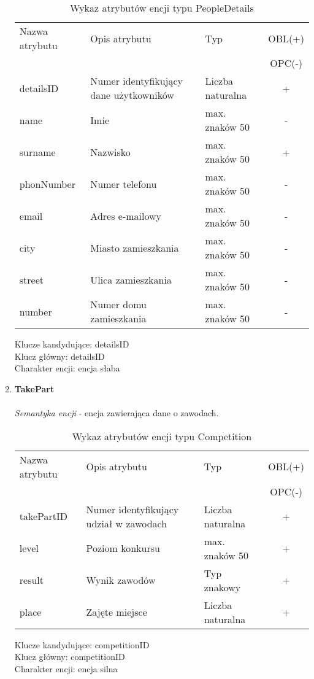 \documentclass[12pt,twoside]{report}
\begin{document}
\begin{enumerate}[start=10,label={\bfseries ENC$\backslash$0\arabic*}]
	\begin{table}[h!]
		\centering
		\begin{tabular}{|l|l|l|c|}
			\hline
			Nazwa atrybutu & Opis atrybutu & Typ & OBL(+) \\
			 & & &  OPC(-) \\
			\hline
			detailsID & Numer identyfikujący dane użytkowników & Liczba naturalna & + \\
			\hline
			name & Imie & max. znaków 50 & - \\
			\hline
			surname & Nazwisko & max. znaków 50 & + \\
			\hline
			phonNumber & Numer telefonu & max. znaków 50 & - \\
			\hline
			email & Adres e-mailowy & max. znaków 50 & - \\
			\hline
			city & Miasto zamieszkania & max. znaków 50 & - \\
			\hline
			street & Ulica zamieszkania & max. znaków 50 & - \\
			\hline
			number & Numer domu zamieszkania & max. znaków 50 & - \\
			\hline
		\end{tabular}
		\caption{Wykaz atrybutów encji typu PeopleDetails }
	\end{table}
Klucze kandydujące: detailsID \\
Klucz główny: detailsID \\
Charakter encji: encja słaba \\

\item \textbf{TakePart}\\ \\
\textit{Semantyka encji} - encja zawierająca dane o zawodach.

\begin{table}[h!]
	\centering
	\begin{tabular}{|l|l|l|c|}
		\hline
		Nazwa atrybutu & Opis atrybutu & Typ & OBL(+) \\
		& & &  OPC(-) \\
		\hline
		takePartID & Numer identyfikujący udział w zawodach & Liczba naturalna & + \\
		\hline
		level & Poziom konkursu & max. znaków 50 & + \\
		\hline
		result & Wynik zawodów & Typ znakowy & + \\
		\hline
		place & Zajęte miejsce &  Liczba naturalna & + \\
		\hline
	\end{tabular}
	\caption{Wykaz atrybutów encji typu Competition }
\end{table}
Klucze kandydujące: competitionID \\
Klucz główny: competitionID \\
Charakter encji: encja silna \\


\end{enumerate}
\end{document}
